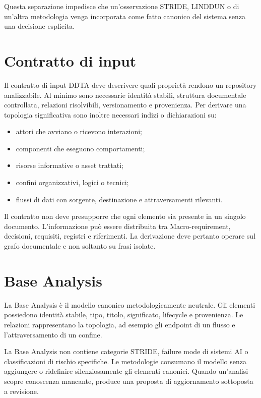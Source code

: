 \documentclass[12pt,a4paper,oneside]{report}
\begin{document}
Questa separazione impedisce che un'osservazione STRIDE, LINDDUN o di un'altra metodologia venga incorporata come fatto canonico del sistema senza una decisione esplicita.

\section{Contratto di input}

Il contratto di input DDTA deve descrivere quali proprietà rendono un repository analizzabile. Al minimo sono necessarie identità stabili, struttura documentale controllata, relazioni risolvibili, versionamento e provenienza. Per derivare una topologia significativa sono inoltre necessari indizi o dichiarazioni su:

\begin{itemize}
  \item attori che avviano o ricevono interazioni;
  \item componenti che eseguono comportamenti;
  \item risorse informative o asset trattati;
  \item confini organizzativi, logici o tecnici;
  \item flussi di dati con sorgente, destinazione e attraversamenti rilevanti.
\end{itemize}

Il contratto non deve presupporre che ogni elemento sia presente in un singolo documento. L'informazione può essere distribuita tra Macro-requirement, decisioni, requisiti, registri e riferimenti. La derivazione deve pertanto operare sul grafo documentale e non soltanto su frasi isolate.

\section{Base Analysis}

La Base Analysis è il modello canonico metodologicamente neutrale. Gli elementi possiedono identità stabile, tipo, titolo, significato, lifecycle e provenienza. Le relazioni rappresentano la topologia, ad esempio gli endpoint di un flusso e l'attraversamento di un confine.

La Base Analysis non contiene categorie STRIDE, failure mode di sistemi AI o classificazioni di rischio specifiche. Le metodologie consumano il modello senza aggiungere o ridefinire silenziosamente gli elementi canonici. Quando un'analisi scopre conoscenza mancante, produce una proposta di aggiornamento sottoposta a revisione.
\end{document}
